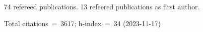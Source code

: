 74 refereed publications. 13 refeered publications as first author.

Total citations~=~3617; h-index~=~34 (2023-11-17)